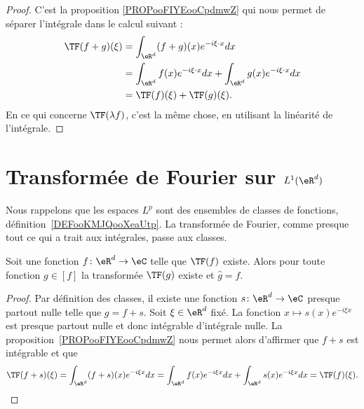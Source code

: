 \begin{proof}
	C'est la proposition \ref{PROPooFIYEooCpdmwZ} qui nous permet de séparer l'intégrale dans le calcul suivant :
	\begin{subequations}
		\begin{align}
			\TF(f+g)(\xi) & =\int_{\eR^d}(f+g)(x) e^{-i\xi\cdot x}dx                                 \\
			              & =\int_{\eR^d}f(x) e^{-i\xi\cdot x}dx+\int_{\eR^d}g(x) e^{-i\xi\cdot x}dx \\
			              & =\TF(f)(\xi)+\TF(g)(\xi).
		\end{align}
	\end{subequations}
	En ce qui concerne \( \TF(\lambda f)\), c'est la même chose, en utilisant la linéarité de l'intégrale.
\end{proof}

\section{Transformée de Fourier sur \( L^1(\eR^d)\)}

Nous rappelons que les espaces \( L^p\) sont des ensembles de classes de fonctions, définition~\ref{DEFooKMJQooXeaUtp}. La transformée de Fourier, comme presque tout ce qui a trait aux intégrales, passe aux classes.

\begin{lemma}
	Soit une fonction \( f\colon \eR^d\to \eC\) telle que \( \TF(f)\) existe. Alors pour toute fonction \( g\in[f]\) la transformée \( \TF(g)\) existe et \( \hat g=\hat f\).
\end{lemma}

\begin{proof}
	Par définition des classes, il existe une fonction \( s\colon \eR^d\to \eC\) presque partout nulle telle que \( g=f+s\). Soit \( \xi\in \eR^d\) fixé. La fonction \( x\mapsto s(x) e^{-i\xi x}\) est presque partout nulle et donc intégrable d'intégrale nulle. La proposition~\ref{PROPooFIYEooCpdmwZ} nous permet alors d'affirmer que \( f+s\) est intégrable et que
	\begin{equation}
		\TF(f+s)(\xi)=\int_{\eR^d}(f+s)(x) e^{-i\xi x}dx=\int_{\eR^d}f(x) e^{-i\xi x}dx+\int_{\eR^d}s(x) e^{-i\xi x}dx=\TF(f)(\xi).
	\end{equation}
\end{proof}

